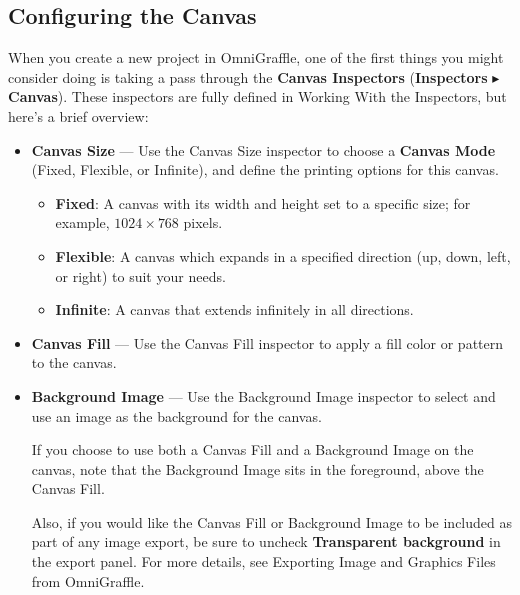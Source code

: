\documentclass[../main.tex]{subfiles}
\begin{document}
\subsection{Configuring the Canvas}
When you create a new project in OmniGraffle, one of the first things you might consider doing
is taking a
pass through the \textbf{Canvas Inspectors} (\textbf{Inspectors} $\blacktriangleright$
\textbf{Canvas}).
These inspectors are fully defined in Working With the Inspectors, but here's a brief overview:
\begin{itemize}
  \item \textbf{Canvas Size} — Use the Canvas Size inspector to choose a \textbf{Canvas Mode}
    (Fixed,
    Flexible, or Infinite),
    and define the printing options for this canvas.
    \begin{itemize}
      \item \textbf{Fixed}: A canvas with its width and height set to a specific size; for
        example, $1024
        \times 768$ pixels.
      \item \textbf{Flexible}: A canvas which expands in a specified direction (up, down, left,
        or right) to
        suit your needs.
      \item \textbf{Infinite}: A canvas that extends infinitely in all directions.
    \end{itemize}
  \item \textbf{Canvas Fill} — Use the Canvas Fill inspector to apply a fill color or pattern to
    the canvas.
  \item \textbf{Background Image} — Use the Background Image inspector to select and use an
    image as the background
    for the canvas.

    \begin{ognote}
      If you choose to use both a Canvas Fill and a Background Image on the canvas, note that
      the Background
      Image sits in the foreground, above the Canvas Fill.

      Also, if you would like the Canvas Fill or Background Image to be included as part of any
      image export,
      be sure to uncheck \textbf{Transparent background} in the export panel. For more details,
      see
      Exporting Image
      and Graphics Files from OmniGraffle.

    \end{ognote}


\end{itemize}
\end{document}
